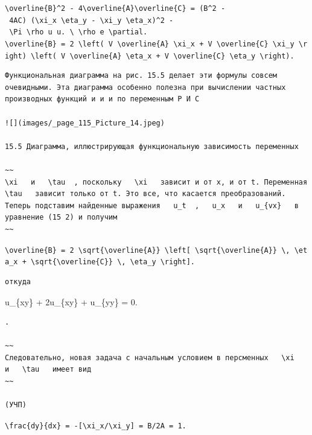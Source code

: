 \documentclass[
  ukrainian,
]{article}
\begin{document}
\texttt{\textbackslash{}overline\{B\}\^{}2\ -\ 4\textbackslash{}overline\{A\}\textbackslash{}overline\{C\}\ =\ (B\^{}2\ -\ 4AC)\ (\textbackslash{}xi\_x\ \textbackslash{}eta\_y\ -\ \textbackslash{}xi\_y\ \textbackslash{}eta\_x)\^{}2\ -\ \textbackslash{}Pi\ \textbackslash{}rho\ u\ u.\ \textbackslash{}\ \textbackslash{}rho\ e\ \textbackslash{}partial.}
\texttt{\textbackslash{}overline\{B\}\ =\ 2\ \textbackslash{}left(\ V\ \textbackslash{}overline\{A\}\ \textbackslash{}xi\_x\ +\ V\ \textbackslash{}overline\{C\}\ \textbackslash{}xi\_y\ \textbackslash{}right)\ \textbackslash{}left(\ V\ \textbackslash{}overline\{A\}\ \textbackslash{}eta\_x\ +\ V\ \textbackslash{}overline\{C\}\ \textbackslash{}eta\_y\ \textbackslash{}right).}

\begin{verbatim}
Функциональная диаграмма на рис. 15.5 делает эти формулы совсем очевидными. Эта диаграмма особенно полезна при вычислении частных производных функций и и и по переменным Р И С

![](images/_page_115_Picture_14.jpeg)

15.5 Диаграмма, иллюстрирующая функциональную зависимость переменных

~~
\xi   и   \tau  , поскольку   \xi   зависит и от x, и от t. Переменная   \tau   зависит только от t. Это все, что касается преобразований. Теперь подставим найденные выражения   u_t  ,   u_x   и   u_{vx}   в уравнение (15 2) и получим
~~
\end{verbatim}

\texttt{\textbackslash{}overline\{B\}\ =\ 2\ \textbackslash{}sqrt\{\textbackslash{}overline\{A\}\}\ \textbackslash{}left{[}\ \textbackslash{}sqrt\{\textbackslash{}overline\{A\}\}\ \textbackslash{},\ \textbackslash{}eta\_x\ +\ \textbackslash{}sqrt\{\textbackslash{}overline\{C\}\}\ \textbackslash{},\ \textbackslash{}eta\_y\ \textbackslash{}right{]}.}

\begin{verbatim}
откуда
\end{verbatim}

u\_\{xy\} + 2u\_\{xy\} + u\_\{yy\} = 0.

\begin{verbatim}
.

~~
Следовательно, новая задача с начальным условием в персменных   \xi   и   \tau   имеет вид
~~

(УЧП)
\end{verbatim}

\texttt{\textbackslash{}frac\{dy\}\{dx\}\ =\ -{[}\textbackslash{}xi\_x/\textbackslash{}xi\_y{]}\ =\ B/2A\ =\ 1.}
\end{document}
